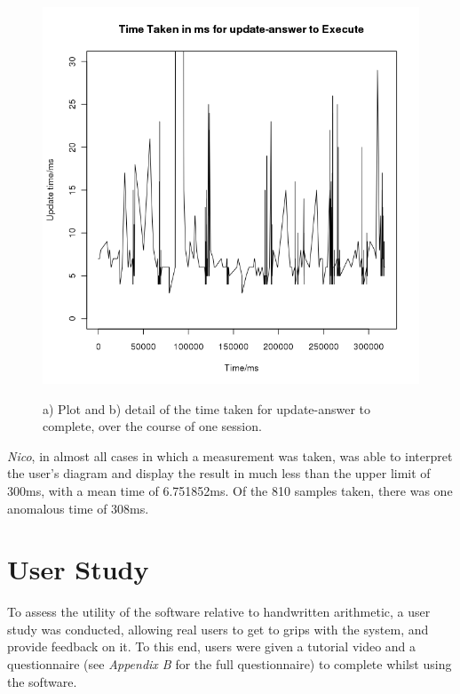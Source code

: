 \documentclass[12pt,twoside,notitlepage,xetex]{report}
\begin{document}
\begin{center}
\begin{figure}[H]
\begin{center}
{\includegraphics[width=\textwidth-2cm]{figs/graphs/update_times_cut30.png}
}
\end{center}
\caption{a) Plot and b) detail of the time taken for {\ttfamily update-answer} to complete, over the course of one session.}
\label{fig:UpdateTimes}
\end{figure}
\end{center}

\emph{Nico}, in almost all cases in which a measurement was taken, was able to interpret the user's diagram and display the result in much less than the upper limit of 300ms, with a mean time of 6.751852ms.  Of the 810 samples taken, there was one anomalous time of 308ms.

%
\section{User Study}

To assess the utility of the software relative to handwritten arithmetic, a user study was conducted, allowing real users to get to grips with the system, and provide feedback on it.  To this end, users were given a tutorial video and a questionnaire (see \emph{Appendix B} for the full questionnaire) to complete whilst using the software.
\end{document}
